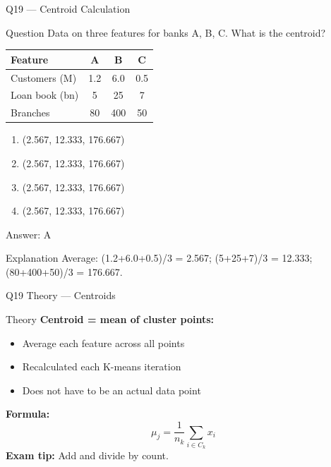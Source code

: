 \documentclass[aspectratio=169,8pt]{beamer}
\begin{document}
	\begin{frame}{Q19 --- Centroid Calculation}
		\begin{block}{Question}
			Data on three features for banks A, B, C. What is the centroid?
			\begin{center}
				\small
				\begin{tabular}{@{}lccc@{}}
					\toprule
					Feature & A & B & C \\
					\midrule
					Customers (M) & 1.2 & 6.0 & 0.5 \\
					Loan book (bn) & 5 & 25 & 7 \\
					Branches & 80 & 400 & 50 \\
					\bottomrule
				\end{tabular}
			\end{center}
		\end{block}
		\begin{enumerate}[label=\Alph*.]
			\item (2.567, 12.333, 176.667)
			\item (2.567, 12.333, 176.667)
			\item (2.567, 12.333, 176.667)
			\item (2.567, 12.333, 176.667)
		\end{enumerate}
		\begin{exampleblock}{Answer: A}
		\end{exampleblock}
		\begin{block}{Explanation}
			Average: (1.2+6.0+0.5)/3 = 2.567; (5+25+7)/3 = 12.333; (80+400+50)/3 = 176.667.
		\end{block}
	\end{frame}
	
	\begin{frame}{Q19 Theory --- Centroids}
		\begin{block}{Theory}
			\textbf{Centroid = mean of cluster points:}
			\begin{itemize}
				\item Average each feature across all points
				\item Recalculated each K-means iteration
				\item Does not have to be an actual data point
			\end{itemize}
			\textbf{Formula:}
			\[
			\mu_j = \frac{1}{n_k} \sum_{i \in C_k} x_i
			\]
			\textbf{Exam tip:} Add and divide by count.
		\end{block}
	\end{frame}
	
\end{document}

